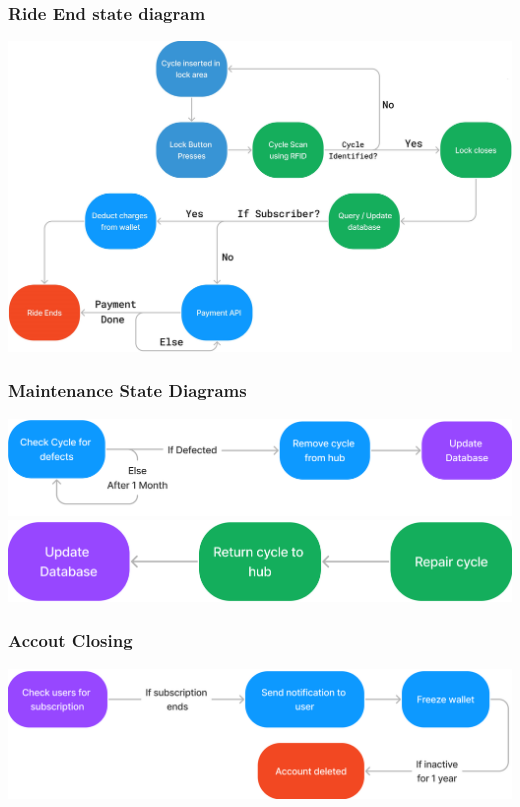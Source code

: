\documentclass[11pt]{article}
\begin{document}
\subsubsection{Ride End state diagram}
\begin{center}
  \includegraphics[scale=0.2]{state-diagram-images/ride_end.jpg}
\end{center}

\subsubsection{Maintenance State Diagrams}
\begin{center}
  \includegraphics[scale=0.25]{state-diagram-images/maintenance-scheduling.png}
  \includegraphics[scale=0.25]{state-diagram-images/cycle-repair.png}
\end{center}

\subsubsection{Accout Closing}
\begin{center}
  \includegraphics[scale=0.25]{state-diagram-images/subscription-end.png}
\end{center}
\end{document}
